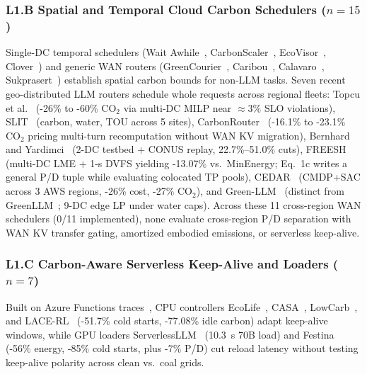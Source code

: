 \subsubsection{L1.B Spatial and Temporal Cloud Carbon Schedulers (\texorpdfstring{$n=15$}{n=15})}
Single-DC temporal schedulers (Wait Awhile~\cite{wiesner2021letswait}, CarbonScaler~\cite{hanafy2023carbonscaler}, EcoVisor~\cite{souza2023ecovisor}, Clover~\cite{li2023clover}) and generic WAN routers (GreenCourier~\cite{chadha2023greencourier}, Caribou~\cite{gsteiger2024caribou}, Calavaro~\cite{calavaro2026offloading}, Sukprasert~\cite{sukprasert2024limitations}) establish spatial carbon bounds for non-LLM tasks. Seven recent geo-distributed LLM routers schedule whole requests across regional fleets: Topcu et al.~\cite{topcu2026tension} (-26\% to -60\% $\text{CO}_2$ via multi-DC MILP near $\approx 3\%$ SLO violations), SLIT~\cite{moore2025slit} (carbon, water, TOU across 5 sites), CarbonRouter~\cite{zhang2026context} (-16.1\% to -23.1\% $\text{CO}_2$ pricing multi-turn recomputation without WAN KV migration), Bernhard and Yardimci~\cite{bernhard2026cleanest} (2-DC testbed + CONUS replay, 22.7\%--51.0\% cuts), FREESH~\cite{he2025freesh} (multi-DC LME + 1-s DVFS yielding -13.07\% vs.\ MinEnergy; Eq.~1c writes a general P/D tuple while evaluating colocated TP pools), CEDAR~\cite{more2026cedar} (CMDP+SAC across 3 AWS regions, -26\% cost, -27\% $\text{CO}_2$), and Green-LLM~\cite{cheng2026greenllm} (distinct from GreenLLM~\cite{shi2024greenllm}; 9-DC edge LP under water caps). Across these 11 cross-region WAN schedulers (0/11 implemented), none evaluate cross-region P/D separation with WAN KV transfer gating, amortized embodied emissions, or serverless keep-alive.

\subsubsection{L1.C Carbon-Aware Serverless Keep-Alive and Loaders (\texorpdfstring{$n=7$}{n=7})}
Built on Azure Functions traces~\cite{shahrad2020serverless}, CPU controllers EcoLife~\cite{jiang2024ecolife}, CASA~\cite{qi2024casa}, LowCarb~\cite{roy2026lowcarb}, and LACE-RL~\cite{sun2026lacere} (-51.7\% cold starts, -77.08\% idle carbon) adapt keep-alive windows, while GPU loaders ServerlessLLM~\cite{fu2024serverlessllm} (10.3~s 70B load) and Festina~\cite{wang2026festina} (-56\% energy, -85\% cold starts, plus -7\% P/D) cut reload latency without testing keep-alive polarity across clean vs.\ coal grids.

